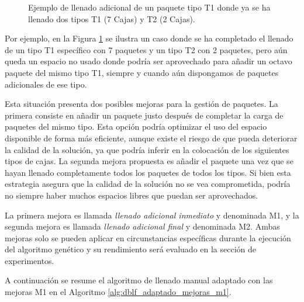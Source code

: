 \begin{figure}[H]
    \centering
    
    \caption{Ejemplo de llenado adicional de un paquete tipo T1 donde ya se ha llenado dos tipos T1 (7 Cajas) y T2 (2 Cajas).}
    \label{fig:llenado_adicional}
\end{figure}

Por ejemplo, en la Figura \ref{fig:llenado_adicional} se ilustra un caso donde se ha completado el llenado de un tipo T1 específico con 7 paquetes y un tipo T2 con 2 paquetes, pero aún queda un espacio no usado donde podría ser aprovechado para añadir un octavo paquete del mismo tipo T1, siempre y cuando aún dispongamos de paquetes adicionales de ese tipo.

Esta situación presenta dos posibles mejoras para la gestión de paquetes. La primera consiste en añadir un paquete justo después de completar la carga de paquetes del mismo tipo. Esta opción podría optimizar el uso del espacio disponible de forma más eficiente, aunque existe el riesgo de que pueda deteriorar la calidad de la solución, ya que podría inferir en la colocación de los siguientes tipos de cajas. La segunda mejora propuesta es añadir el paquete una vez que se hayan llenado completamente todos los paquetes de todos los tipos. Si bien esta estrategia asegura que la calidad de la solución no se vea comprometida, podría no siempre haber muchos espacios libres que puedan ser aprovechados.

La primera mejora es llamada \textit{llenado adicional inmediato} y denominada M1, y la segunda mejora es llamada \textit{llenado adicional final} y denominada  M2. Ambas mejoras solo se pueden aplicar en circunstancias específicas durante la ejecución del algoritmo genético y su rendimiento será evaluado en la sección de experimentos.

A continuación se resume el algoritmo de llenado manual adaptado con las mejoras M1 en el Algoritmo \ref{alg:dblf_adaptado_mejoras_m1}.

